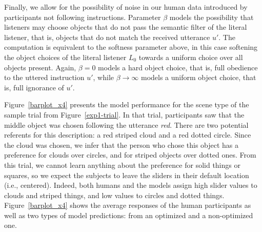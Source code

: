 \documentclass[10pt,a4paper]{article}
\begin{document}

Finally, we allow for the possibility of noise in our human data introduced by participants not following instructions.
Parameter $\beta$ models the possibility that listeners may choose objects that do not pass the semantic filter of the literal listener, that is, objects that do not match the received utterance $u'$. 
The computation is equivalent to the softness parameter above, in this case softening the object choices of the literal listener $L_0$ towards a uniform choice over all objects present. 
Again, $\beta=0$ models a hard object choice, that is, full obedience to the uttered instruction $u'$, 
while $\beta \rightarrow \infty$ models a uniform object choice, that is, full ignorance of $u'$.


Figure~\ref{barplot_x4} presents the model performance for the scene type of the sample trial from Figure~\ref{exp1-trial}. In that trial, participants saw that the middle object was chosen following the utterance \textit{red}. There are two potential referents for this description: a red striped cloud and a red dotted circle. Since the cloud was chosen, we infer that the person who chose this object has a preference for clouds over circles, and for striped objects over dotted ones. From this trial, we cannot learn anything about the preference for solid things or squares, so we expect the subjects to leave the sliders in their default location (i.e., centered).
Indeed, both humans and the models assign high slider values to clouds and striped things, and low values to circles and dotted things. 
Figure~\ref{barplot_x4} shows the average responses of the human participants as well as two types of model predictions: from an optimized and a non-optimized one.
\end{document}
